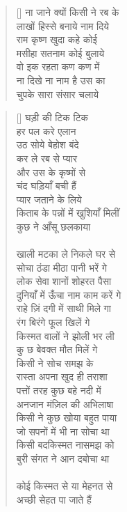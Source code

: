 \begin{verse}[\versewidth]\texthindi{
ना जाने क्यों किसी ने रब के\\
लाखों हिस्से बनाये नाम दिये\\
राम कृष्ण खुदा कहे कोई\\
मसीहा सतनाम कोई बुलाये\\
वो इक रहता कण कण में\\
ना दिखे ना नाम है उस का\\
चुपके सारा संसार चलाये
}\end{verse}

\begin{verse}[\versewidth]\texthindi{
घड़ी की टिक टिक\\
हर पल करे एलान\\
उठ सोये बेहोश बंदे\\
कर ले रब से प्यार\\
और उस के कृष्मों से\\
चंद घड़ियाँ बची हैं\\
प्यार जताने के लिये\\
किताब के पन्नों में खुशियाँ मिलीं\\
कुछ ने आँसू छलकाया\\
\\
खाली मटका ले निकले घर से\\
सोचा ठंडा मीठा पानी भरें गे\\
लोक सेवा शानों शोहरत पैसा\\
दुनियाँ में ऊँचा नाम काम करें गे\\
राहे ज़िं दगी में साथी मिले गा\\
रंग बिरंगे फूल खिलें गे\\
किस्मत वालों ने झोली भर ली\\
कु छ बेवक्त मौत मिलें गे\\
किसी ने सोच समझ के\\
रास्ता अपना खुद ही तराशा\\
पत्तों तरह कुछ बहे नदी में\\
अनजान मंज़िल की अभिलाषा\\
किसी ने कुछ खोया बहुत पाया\\
जो सपनों में भी ना सोचा था\\
किसी बदकिस्मत नासमझ को\\
बुरी संगत ने आन दबोचा था\\
\\
कोई किस्मत से या मेहनत से\\
अच्छी सेहत पा जाते हैं\\
}
\end{verse}
